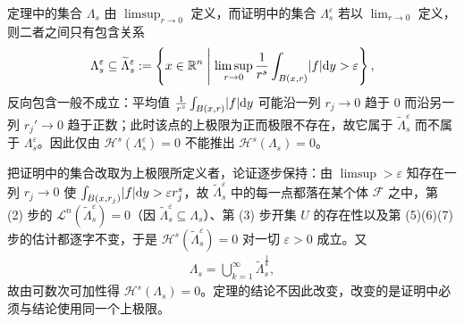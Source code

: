 \documentclass[../../main.tex]{subfiles}%
\begin{document}
\begin{remark}\label{remark:ch02-thm-2-10-上极限}
定理中的集合 $\Lambda_s$ 由 $\limsup_{r\to0}$ 定义，而证明中的集合 $\Lambda_s^\varepsilon$ 若以 $\lim_{r\to0}$ 定义，则二者之间只有包含关系
\begin{align*}
\Lambda_s^\varepsilon\subseteq\widetilde\Lambda_s^\varepsilon:=\left\{x\in\mathbb{R}^n\Biggm|\limsup_{r\to0}\frac{1}{r^s}\int_{B(x,r)}\lvert f\rvert\mathrm{d} y>\varepsilon\right\},
\end{align*}
反向包含一般不成立：平均值 $\frac{1}{r^s}\int_{B(x,r)}\lvert f\rvert\mathrm{d} y$ 可能沿一列 $r_j\to0$ 趋于 $0$ 而沿另一列 $r_j'\to0$ 趋于正数；此时该点的上极限为正而极限不存在，故它属于 $\widetilde\Lambda_s^\varepsilon$ 而不属于 $\Lambda_s^\varepsilon$。因此仅由 $\mathcal{H}^s(\Lambda_s^\varepsilon)=0$ 不能推出 $\mathcal{H}^s(\Lambda_s)=0$。

把证明中的集合改取为上极限所定义者，论证逐步保持：由 $\limsup>\varepsilon$ 知存在一列 $r_j\to0$ 使 $\int_{B(x,r_j)}\lvert f\rvert\mathrm{d} y>\varepsilon r_j^s$，故 $\widetilde\Lambda_s^\varepsilon$ 中的每一点都落在某个体 $\mathcal{F}$ 之中，第 (2) 步的 $\mathcal{L}^n(\widetilde\Lambda_s^\varepsilon)=0$（因 $\widetilde\Lambda_s^\varepsilon\subseteq\Lambda_s$）、第 (3) 步开集 $U$ 的存在性以及第 (5)(6)(7) 步的估计都逐字不变，于是 $\mathcal{H}^s(\widetilde\Lambda_s^\varepsilon)=0$ 对一切 $\varepsilon>0$ 成立。又
\begin{align*}
\Lambda_s=\bigcup_{k=1}^{\infty}\widetilde\Lambda_s^{\frac1k},
\end{align*}
故由可数次可加性得 $\mathcal{H}^s(\Lambda_s)=0$。定理的结论不因此改变，改变的是证明中必须与结论使用同一个上极限。
\end{remark}
\end{document}

